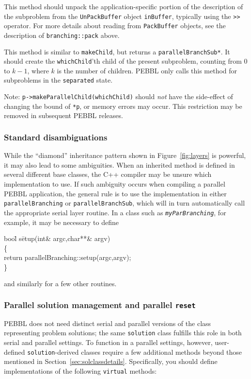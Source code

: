 This method should unpack the application-specific portion of the
description of the subproblem from the \texttt{UnPackBuffer} object
\texttt{inBuffer}, typically using the \texttt{>>} operator.  For
more details about reading from \texttt{PackBuffer} objects, see the
description of \texttt{branching::pack} above.

This method is similar to \texttt{makeChild}, but returns a
\texttt{parallelBranchSub*}.  It should create the
\texttt{whichChild}'th child of the present subproblem, counting from
$0$ to $k-1$, where $k$ is the number of children.  PEBBL only calls
this method for subproblems in the \texttt{separated} state.

Note: \texttt{p->makeParallelChild(whichChild)} should \emph{not} have
the side-effect of changing the bound of \texttt{*p}, or memory errors
may occur.  This restriction may be removed in subsequent PEBBL
releases.


\subsubsection{Standard disambiguations}
While the ``diamond'' inheritance pattern shown in
Figure~\ref{fig:layers} is powerful, it may also lead
to some ambiguities.  When an inherited method is defined in several
different base classes, the C++ compiler may be unsure which
implementation to use.  If such ambiguity occurs when compiling a
parallel PEBBL application, the general rule is to use the
implementation in either \texttt{parallelBranching} or
\texttt{parallelBranchSub}, which will in turn automatically call the
appropriate serial layer routine.  In a class such as
\texttt{\textit{myParBranching}}, for example, it may be necessary to
define
\begin{codeblock}
boo\=l s\=etup(int\& argc,char**\& argv) \\
\>    \{  \\
\>\>      return parallelBranching::setup(argc,argv); \\
 \>   \}
\end{codeblock}
and similarly for a few other routines.


\subsubsection{Parallel solution management and parallel \texttt{reset}}
\label{sec:parsol}
PEBBL does not need distinct serial and parallel versions of the class
representing problem solutions; the same \texttt{solution} class
fulfills this role in both serial and parallel settings.  To function
in a parallel settings, however, user-defined
\texttt{solution}-derived classes require a few additional methods
beyond those mentioned in Section~\ref{sec:solclassdetails}.
Specifically, you should define implementations of the following
\texttt{virtual} methods:

